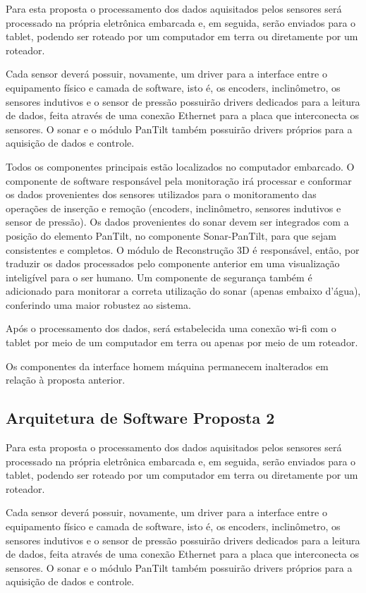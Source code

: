 Para esta proposta o processamento dos dados aquisitados pelos sensores será
processado na própria eletrônica embarcada e, em seguida,
 serão enviados para o tablet, podendo ser roteado por um computador em terra ou
 diretamente por um roteador.
 
Cada sensor deverá possuir, novamente, um driver para a interface entre o
equipamento físico e camada de software,
 isto é, os encoders, inclinômetro, os sensores indutivos e o sensor de pressão
 possuirão drivers dedicados para a leitura de dados,
feita através de uma conexão Ethernet para a placa que interconecta os sensores.
O sonar e o módulo PanTilt também possuirão drivers próprios para a aquisição de
dados e controle.

Todos os componentes principais estão localizados no computador embarcado.
O componente de software responsável pela monitoração irá processar e conformar
os dados provenientes dos sensores utilizados para o monitoramento das operações
de inserção e remoção (encoders, inclinômetro, sensores indutivos
 e sensor de pressão). Os dados provenientes do sonar devem ser integrados com a
 posição do elemento PanTilt,
  no componente Sonar-PanTilt, para que sejam consistentes e completos.  O
  módulo de Reconstrução 3D é responsável,
   então, por traduzir os dados processados pelo componente anterior em uma
   visualização inteligível para o ser humano.
Um componente de segurança também é adicionado para monitorar a correta
utilização do sonar (apenas embaixo d’água), conferindo uma maior robustez ao
sistema.

Após o processamento dos dados, será estabelecida uma conexão wi-fi com o tablet
por meio de um computador em terra ou
 apenas por meio de um roteador.
 
Os componentes da interface homem máquina permanecem inalterados em relação à
proposta anterior.


\subsection{Arquitetura de Software Proposta 2}

Para esta proposta o processamento dos dados aquisitados pelos sensores será
processado na própria eletrônica embarcada e, em seguida,
 serão enviados para o tablet, podendo ser roteado por um computador em terra ou
 diretamente por um roteador.
 
Cada sensor deverá possuir, novamente, um driver para a interface entre o
equipamento físico e camada de software,
 isto é, os encoders, inclinômetro, os sensores indutivos e o sensor de pressão
 possuirão drivers dedicados para a leitura de dados,
feita através de uma conexão Ethernet para a placa que interconecta os sensores.
O sonar e o módulo PanTilt também possuirão drivers próprios para a aquisição de
dados e controle.

